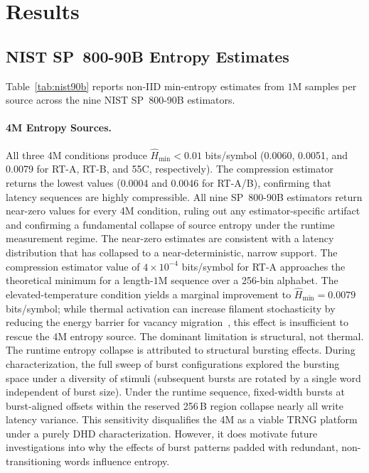 \section{Results}
\label{sec:trng-results}

\subsection{NIST SP~800-90B Entropy Estimates}
Table~\ref{tab:nist90b} reports non-IID min-entropy estimates from
$1\mathrm{M}$ samples per source across the nine NIST SP~800-90B
estimators.

\paragraph{4M Entropy Sources.}

All three 4M conditions produce $\hat{H}_{\min} < 0.01$ bits/symbol
(0.0060, 0.0051, and 0.0079 for RT-A, RT-B, and 55\textdegree{}C,
respectively). The compression estimator returns the lowest values
(0.0004 and 0.0046 for RT-A/B), confirming that latency sequences are
highly compressible. All nine SP~800-90B estimators return near-zero
values for every 4M condition, ruling out any estimator-specific
artifact and confirming a fundamental collapse of source entropy under
the runtime measurement regime. The near-zero estimates are consistent
with a latency distribution that has collapsed to a near-deterministic,
narrow support. The compression estimator value of $4\times10^{-4}$
bits/symbol for RT-A approaches the theoretical minimum for a
length-$1\mathrm{M}$ sequence over a 256-bin alphabet. The
elevated-temperature condition yields a marginal improvement to
$\hat{H}_{\min} = 0.0079$ bits/symbol; while thermal activation can
increase filament stochasticity by reducing the energy barrier for
vacancy migration~\cite{yu2012switching}, this effect is insufficient to
rescue the 4M entropy source. The dominant limitation is structural, not
thermal. The runtime entropy collapse is attributed to structural
bursting effects. During characterization, the full sweep of burst
configurations explored the bursting space under a diversity of stimuli
(subsequent bursts are rotated by a single word independent of burst
size). Under the runtime sequence, fixed-width bursts at burst-aligned
offsets within the reserved 256\,B region collapse nearly all write
latency variance. This sensitivity disqualifies the 4M as a viable TRNG
platform under a purely DHD characterization. However, it does motivate
future investigations into why the effects of burst patterns padded with
redundant, non-transitioning words influence entropy.

